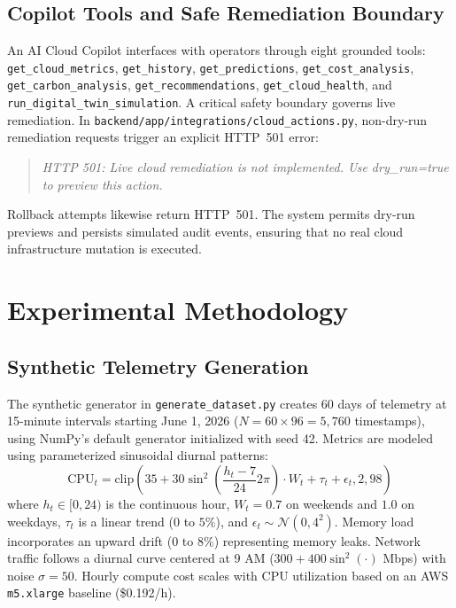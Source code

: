 \documentclass[conference]{IEEEtran}
\begin{document}
\subsection{Copilot Tools and Safe Remediation Boundary}
An AI Cloud Copilot interfaces with operators through eight grounded tools: \texttt{get\_cloud\_metrics}, \texttt{get\_history}, \texttt{get\_predictions}, \texttt{get\_cost\_analysis}, \texttt{get\_carbon\_analysis}, \texttt{get\_recommendations}, \texttt{get\_cloud\_health}, and \texttt{run\_digital\_twin\_simulation}.
A critical safety boundary governs live remediation. In \texttt{backend/app/integrations/cloud\_actions.py}, non-dry-run remediation requests trigger an explicit HTTP~501 error:
\begin{quote}
\textit{HTTP 501: Live cloud remediation is not implemented. Use dry\_run=true to preview this action.}
\end{quote}
Rollback attempts likewise return HTTP~501. The system permits dry-run previews and persists simulated audit events, ensuring that no real cloud infrastructure mutation is executed.

\section{Experimental Methodology}

\subsection{Synthetic Telemetry Generation}
The synthetic generator in \texttt{generate\_dataset.py} creates 60 days of telemetry at 15-minute intervals starting June 1, 2026 ($N = 60 \times 96 = 5{,}760$ timestamps), using NumPy's default generator initialized with seed 42. Metrics are modeled using parameterized sinusoidal diurnal patterns:
\begin{equation}
    \text{CPU}_t = \text{clip}\left(35 + 30 \sin^2\left(\frac{h_t - 7}{24} 2\pi\right) \cdot W_t + \tau_t + \epsilon_t, 2, 98\right)
\end{equation}
where $h_t \in [0, 24)$ is the continuous hour, $W_t = 0.7$ on weekends and $1.0$ on weekdays, $\tau_t$ is a linear trend ($0$ to $5\%$), and $\epsilon_t \sim \mathcal{N}(0, 4^2)$. Memory load incorporates an upward drift ($0$ to $8\%$) representing memory leaks. Network traffic follows a diurnal curve centered at 9 AM ($300 + 400 \sin^2(\cdot)$ Mbps) with noise $\sigma = 50$. Hourly compute cost scales with CPU utilization based on an AWS \texttt{m5.xlarge} baseline (\$0.192/h).
\end{document}
